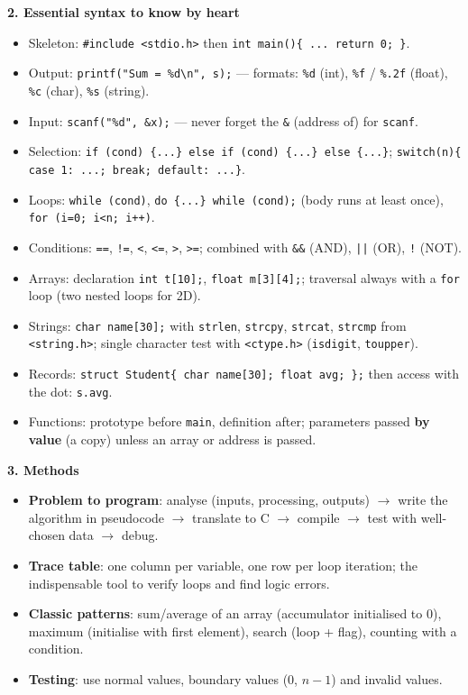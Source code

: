 \documentclass[11pt]{article}
\begin{document}
\begin{bilan}
\textbf{2. Essential syntax to know by heart}
\begin{itemize}
\item Skeleton: \texttt{\#include <stdio.h>} then \texttt{int main()\{ ... return 0; \}}.
\item Output: \texttt{printf("Sum = \%d\textbackslash n", s);} — formats: \texttt{\%d} (int), \texttt{\%f} / \texttt{\%.2f} (float), \texttt{\%c} (char), \texttt{\%s} (string).
\item Input: \texttt{scanf("\%d", \&x);} — never forget the \texttt{\&} (address of) for \texttt{scanf}.
\item Selection: \texttt{if (cond) \{...\} else if (cond) \{...\} else \{...\}}; \texttt{switch(n)\{ case 1: ...; break; default: ...\}}.
\item Loops: \texttt{while (cond)}, \texttt{do \{...\} while (cond);} (body runs at least once), \texttt{for (i=0; i<n; i++)}.
\item Conditions: \texttt{==}, \texttt{!=}, \texttt{<}, \texttt{<=}, \texttt{>}, \texttt{>=}; combined with \texttt{\&\&} (AND), \texttt{||} (OR), \texttt{!} (NOT).
\item Arrays: declaration \texttt{int t[10];}, \texttt{float m[3][4];}; traversal always with a \texttt{for} loop (two nested loops for 2D).
\item Strings: \texttt{char name[30];} with \texttt{strlen}, \texttt{strcpy}, \texttt{strcat}, \texttt{strcmp} from \texttt{<string.h>}; single character test with \texttt{<ctype.h>} (\texttt{isdigit}, \texttt{toupper}).
\item Records: \texttt{struct Student\{ char name[30]; float avg; \};} then access with the dot: \texttt{s.avg}.
\item Functions: prototype before \texttt{main}, definition after; parameters passed \textbf{by value} (a copy) unless an array or address is passed.
\end{itemize}

\textbf{3. Methods}
\begin{itemize}
\item \textbf{Problem to program}: analyse (inputs, processing, outputs) $\rightarrow$ write the algorithm in pseudocode $\rightarrow$ translate to C $\rightarrow$ compile $\rightarrow$ test with well-chosen data $\rightarrow$ debug.
\item \textbf{Trace table}: one column per variable, one row per loop iteration; the indispensable tool to verify loops and find logic errors.
\item \textbf{Classic patterns}: sum/average of an array (accumulator initialised to 0), maximum (initialise with first element), search (loop + flag), counting with a condition.
\item \textbf{Testing}: use normal values, boundary values (0, $n-1$) and invalid values.
\end{itemize}


\end{bilan}
\end{document}
